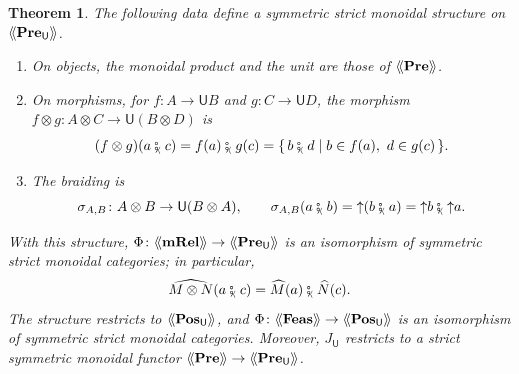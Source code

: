 \documentclass[11pt,a4paper]{article}
\theoremstyle{plain}
\newtheorem{theorem}{Theorem}[section]
\theoremstyle{definition}
\theoremstyle{remark}
\newcommand{\Cat}[1]{\mathbf{#1}}
\newcommand{\Pre}{\Cat{Pre}}
\newcommand{\Pos}{\Cat{Pos}}
\newcommand{\mRel}{\Cat{mRel}}
\newcommand{\Feas}{\Cat{Feas}}
\newcommand{\U}{\mathsf{U}}
\newcommand{\PreU}{\Pre_{\U}}
\newcommand{\PosU}{\Pos_{\U}}
\providecommand{\llangle}{\mathopen{\langle\mkern-3.5mu\langle}}
\providecommand{\rrangle}{\mathclose{\rangle\mkern-3.5mu\rangle}}
\newcommand{\tL}[1]{\llangle #1 \rrangle}
\newcommand{\tc}{\mathbin{\fatsemi_{\!\scriptscriptstyle\langle}}}
\newcommand{\up}{\mathord{\uparrow}}
\begin{document}
\begin{theorem}
    \label{thm:strict-monoidal}
    The following data define a symmetric strict monoidal structure on $\tL{\PreU}$.
    \begin{enumerate}
        \item On objects, the monoidal product and the unit are those of $\tL{\Pre}$.
        \item On morphisms, for $f \colon A \to \U B$ and $g \colon C \to \U D$, the morphism $f \otimes g \colon A \otimes C \to \U(B \otimes D)$ is
              \begin{equation}
                  \label{eq:strict-kleisli-product}
                  (f \otimes g)(a \tc c) = f(a) \tc g(c) = \{\, b \tc d \mid b \in f(a),\ d \in g(c) \,\}.
              \end{equation}
        \item The braiding is
              \begin{equation}
                  \label{eq:strict-kleisli-braiding}
                  \sigma_{A,B} \colon A \otimes B \to \U(B \otimes A),
                  \qquad
                  \sigma_{A,B}(a \tc b) = \up (b \tc a) = \up b \tc \up a.
              \end{equation}
    \end{enumerate}
    With this structure, $\Phi \colon \tL{\mRel} \to \tL{\PreU}$ is an isomorphism of symmetric strict monoidal categories; in particular,
    \begin{equation}
        \label{eq:hat-strict-product}
        \widehat{M \otimes N}(a \tc c) = \widehat{M}(a) \tc \widehat{N}(c).
    \end{equation}
    The structure restricts to $\tL{\PosU}$, and $\Phi \colon \tL{\Feas} \to \tL{\PosU}$ is an isomorphism of symmetric strict monoidal categories.
    Moreover, $J_{\U}$ restricts to a strict symmetric monoidal functor $\tL{\Pre} \to \tL{\PreU}$.
\end{theorem}
\end{document}
